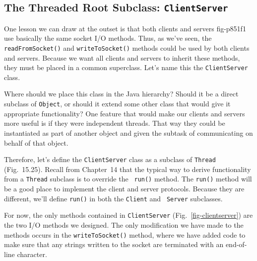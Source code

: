 \subsection*{The Threaded Root Subclass: {\tt ClientServer} }
\noindent One lesson we can draw at the outset is that both clients and servers
{fig-p851f1}
use basically the same socket I/O methods.  Thus, as we've seen, the
{\tt readFromSocket()} and {\tt writeToSocket()} methods could be used
by both clients and servers.  Because we want all clients and servers to
inherit these methods, they must be placed in a common
superclass.  Let's name this the {\tt ClientServer} class.


Where should we place this class in the Java hierarchy? Should it be a
direct subclass of {\tt Object}, or should it extend some other class
that would give it appropriate functionality?  One feature that would
make our clients and servers more useful is if they were independent
threads.  That way they could be instantiated as part of another object
and given the subtask of communicating on behalf of that object. 

Therefore, let's define the {\tt ClientServer} class as a subclass of
{\tt Thread} (Fig.~15.25). Recall from
Chapter~14 that the typical way to derive
functionality from a {\tt Thread} subclass is to override the {\tt
run()} method.  The {\tt run()} method will be a good place to
implement the client and server protocols.  Because they are
different, we'll define {\tt run()} in both the {\tt Client} and {\tt
Server} subclasses.

For now, the only methods contained in {\tt ClientServer}
(Fig.~\ref{fig-clientserver}) are the two I/O methods we designed.
The only modification we have made to the methods occurs in
the {\tt writeToSocket()} method, where we have added code to make
sure that any strings written to the socket are terminated with an
end-of-line character.

